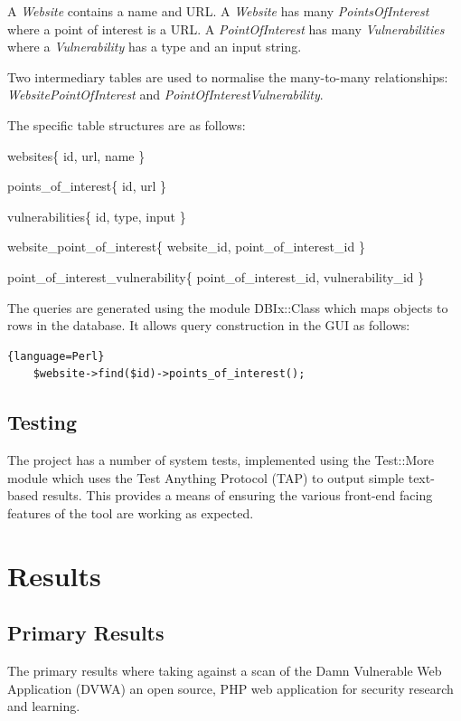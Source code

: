 \documentclass[12pt,a4paper]{article}
\begin{document}
A \emph{Website} contains a name and URL.
A \emph{Website} has many \emph{PointsOfInterest} where a point of interest is a URL.
A \emph{PointOfInterest} has many \emph{Vulnerabilities} where a \emph{Vulnerability} has a type and an input string.

Two intermediary tables are used to normalise the many-to-many relationships: \emph{WebsitePointOfInterest} and \emph{PointOfInterestVulnerability}.

The specific table structures are as follows:

websites\{ id, url, name \}

points\_of\_interest\{ id, url \}

vulnerabilities\{ id, type, input \}

website\_point\_of\_interest\{ website\_id, point\_of\_interest\_id \}

point\_of\_interest\_vulnerability\{ point\_of\_interest\_id, vulnerability\_id \}

The queries are generated using the module DBIx::Class which maps objects to rows in the database.  It allows query construction in the GUI as follows:

\begin{lstlisting}{language=Perl}
    $website->find($id)->points_of_interest();
\end{lstlisting}

\subsection{Testing}
The project has a number of system tests, implemented using the Test::More module which uses the Test Anything Protocol (TAP) to output simple text-based results.  This provides a means of ensuring the various front-end facing features of the tool are working as expected.

\section{Results}

\subsection{Primary Results}
The primary results where taking against a scan of the Damn Vulnerable Web Application (DVWA) an open source, PHP web application for security research and learning. \cite{DVWA:2010:Online}
\end{document}
